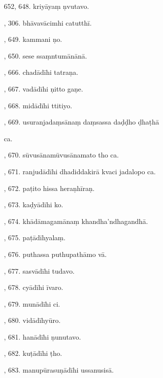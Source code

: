 652, 648. kriyāyaṃ ṇvutavo.\hfill \pageref{sut:652}\par {}, 306. bhāvavācimhi catutthī.\hfill \pageref{sut:653}\par {}, 649. kammani ṇo.\hfill \pageref{sut:654}\par {}, 650. sese ssaṃntumānānā.\hfill \pageref{sut:655}\par {}, 666. chadādīhi tatraṇa.\hfill \pageref{sut:656}\par {}, 667. vadādīhi ṇitto gaṇe.\hfill \pageref{sut:657}\par {}, 668. midādīhi ttitiyo.\hfill \pageref{sut:658}\par {}, 669. usuranjadaṃsānaṃ daṃsassa daḍḍho ḍhaṭhā\par \noindent
\hspace{15mm} ca.\hfill \pageref{sut:659}\par {}, 670. sūvusānamūvusānamato tho ca.\hfill \pageref{sut:660}\par {}, 671. ranjudādīhi dhadiddakirā kvaci jadalopo ca.\hfill \pageref{sut:661}\par {}, 672. paṭito hissa heraṇhīraṇ.\hfill \pageref{sut:662}\par {}, 673. kaḍyādīhi ko.\hfill \pageref{sut:663}\par {}, 674. khādāmagamānaṃ khandha’ndhagandhā.\hfill \pageref{sut:664}\par {}, 675. paṭādīhyalaṃ.\hfill \pageref{sut:665}\par {}, 676. puthassa puthupathāmo vā.\hfill \pageref{sut:666}\par {}, 677. sasvādīhi tudavo.\hfill \pageref{sut:667}\par {}, 678. cyādīhi īvaro.\hfill \pageref{sut:668}\par {}, 679. munādīhi ci.\hfill \pageref{sut:669}\par {}, 680. vidādīhyūro.\hfill \pageref{sut:670}\par {}, 681. hanādīhi ṇunutavo.\hfill \pageref{sut:671}\par {}, 682. kuṭādīhi ṭho.\hfill \pageref{sut:672}\par {}, 683. manupūrasuṇādīhi ussanusisā.\hfill \pageref{sut:673}\par \noindent
